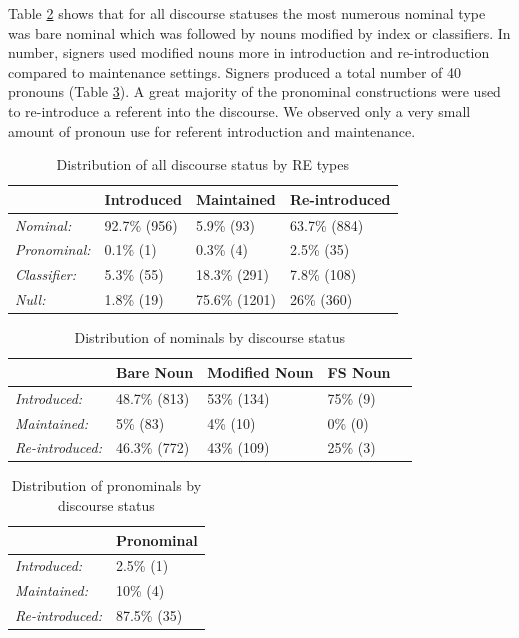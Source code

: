 \documentclass[]{elsarticle} %
\begin{document}
Table \ref{tab:my-table2} shows that for all discourse statuses the most
numerous nominal type was bare nominal which was followed by nouns
modified by index or classifiers. In number, signers used modified nouns
more in introduction and re-introduction compared to maintenance
settings. Signers produced a total number of 40 pronouns (Table
\ref{tab:my-table3}). A great majority of the pronominal constructions
were used to re-introduce a referent into the discourse. We observed
only a very small amount of pronoun use for referent introduction and
maintenance.

\begin{table}
\small
\caption{Distribution of all discourse status by RE types}
\label{tab:my-table}
\begin{tabular}{llll}
\hline
                     & Introduced    & Maintained     & Re-introduced \\ \hline
\textit{Nominal:}    & 92.7\% (956) & 5.9\% (93)    & 63.7\% (884) \\
\textit{Pronominal:} & 0.1\% (1)    & 0.3\% (4)     & 2.5\% (35)   \\
\textit{Classifier:} & 5.3\% (55)   & 18.3\% (291)  & 7.8\% (108)     \\
\textit{Null:}       & 1.8\% (19)   & 75.6\% (1201) & 26\% (360) \\ \hline
\end{tabular}%
\end{table}

\begin{table}
\small
\caption{Distribution of nominals by discourse status}
\label{tab:my-table2}
\begin{tabular}{lllll}
\hline
                        & Bare Noun  & Modified Noun & FS Noun \\ \hline
\textit{Introduced:}    & 48.7\% (813) & 53\% (134)     & 75\% (9) \\
\textit{Maintained:}    & 5\% (83)  & 4\% (10)      & 0\% (0) \\
\textit{Re-introduced:} & 46.3\% (772) & 43\% (109)     & 25\% (3) \\ \hline
\end{tabular}
\end{table}

\begin{table}
\small
\caption{Distribution of pronominals by discourse status}
\label{tab:my-table3}
\begin{tabular}{ll}
\hline
                        & Pronominal  \\ \hline
\textit{Introduced:}    & 2.5\% (1)   \\
\textit{Maintained:}    & 10\% (4)    \\
\textit{Re-introduced:} & 87.5\% (35) \\ \hline
\end{tabular}
\end{table}
\end{document}
